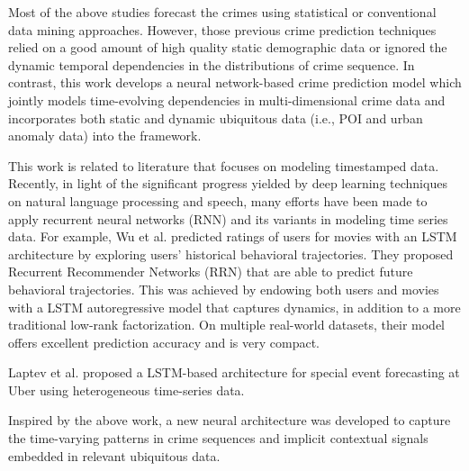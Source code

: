 \noindent Most of the above studies forecast the crimes using statistical
or conventional data mining approaches. However, those previous
crime prediction techniques relied on a good amount of high quality
static demographic data or ignored the dynamic temporal dependencies in the 
distributions of crime sequence. In contrast, this work
develops a neural network-based crime prediction model which
jointly models time-evolving dependencies in multi-dimensional
crime data and incorporates both static and dynamic ubiquitous
data (i.e., POI and urban anomaly data) into the framework.


\noindent This work is related to literature that focuses on modeling timestamped
 data. Recently, in light of the significant progress yielded 
 by deep learning techniques on natural language processing and speech, many efforts have been made to apply recurrent neural networks (RNN) and its variants in modeling time series data. 
 For example, Wu et al. \cite{p9} predicted ratings of users for movies with an LSTM 
 architecture by exploring users’ historical behavioral trajectories. 
 They proposed Recurrent Recommender Networks (RRN) that are able to predict
  future behavioral trajectories. This was achieved by endowing both users and
   movies with a LSTM autoregressive model that captures dynamics, in addition
    to a more traditional low-rank factorization. On multiple real-world datasets, 
    their model offers
excellent prediction accuracy and is very compact.

\noindent Laptev et al. \cite{p8} proposed a LSTM-based
architecture for special event forecasting at Uber using heterogeneous 
time-series data. 

\noindent Inspired by the above work, a new neural architecture was developed to 
capture the time-varying patterns in crime sequences and implicit contextual signals
 embedded in relevant ubiquitous data.

